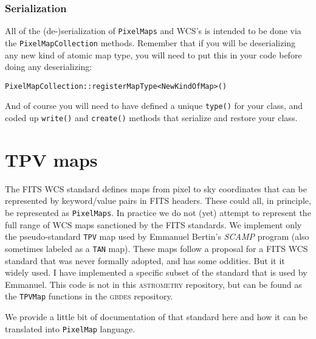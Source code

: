\documentclass[11pt,preprint,flushrt]{aastex}
\begin{document}
\subsubsection{Serialization}
All of the (de-)serialization of {\tt PixelMaps} and WCS's is intended to be done via the {\tt PixelMapCollection} methods.  Remember that if you will be deserializing any new kind of atomic map type, you will need to put this in your code before doing any deserializing:
\begin{verbatim}
PixelMapCollection::registerMapType<NewKindOfMap>()
\end{verbatim}
And of course you will need to have defined a unique \texttt{type()} for your class, and coded up \texttt{write()} and \texttt{create()} methods that serialize and restore your class.

\section{TPV maps}

The FITS WCS standard defines maps from pixel to sky coordinates that can be represented by keyword/value pairs in FITS headers.  These could all, in principle, be represented as \texttt{PixelMaps}.
In practice we do not (yet) attempt to represent the full range of WCS maps sanctioned by the FITS standards.  We implement only the pseudo-standard {\tt TPV} map used by Emmanuel Bertin's {\it SCAMP} program (also sometimes labeled as a {\tt TAN} map).
These maps follow a proposal for a FITS WCS standard that was never formally adopted, and has some oddities.  But it it widely used.  I have implemented a specific subset of the standard that is used by Emmanuel.
This code is not in this \textsc{astrometry} repository, but can be found as the \texttt{TPVMap} functions in the \textsc{gbdes} repository.

We provide a little bit of documentation of that standard here and how it can be translated into \texttt{PixelMap} language.
\end{document}
